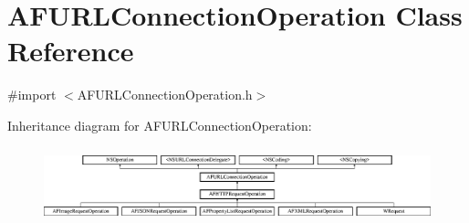 \hypertarget{interface_a_f_u_r_l_connection_operation}{\section{A\-F\-U\-R\-L\-Connection\-Operation Class Reference}
\label{interface_a_f_u_r_l_connection_operation}
}


{\ttfamily \#import $<$A\-F\-U\-R\-L\-Connection\-Operation.\-h$>$}

Inheritance diagram for A\-F\-U\-R\-L\-Connection\-Operation\-:\begin{figure}[H]
\begin{center}
\leavevmode
\includegraphics[height=2.185366cm]{interface_a_f_u_r_l_connection_operation}
\end{center}
\end{figure}

